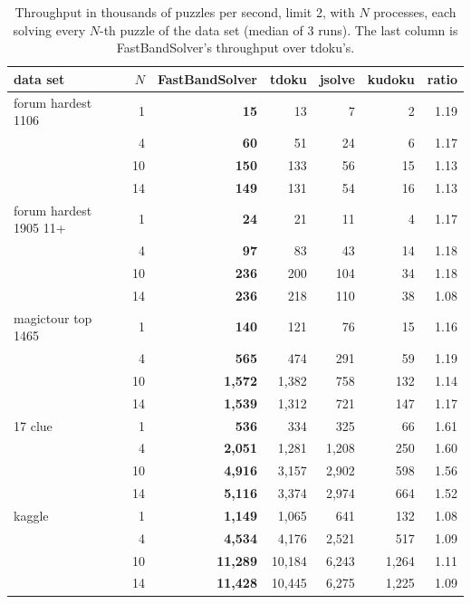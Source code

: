 \documentclass[11pt]{article}
\theoremstyle{definition}
\theoremstyle{plain}
\begin{document}
\begin{table}[t]
\centering
\caption{Throughput in thousands of puzzles per second, limit 2, with $N$ processes, each solving every $N$-th puzzle of the data set (median of 3 runs). The last column is FastBandSolver's throughput over tdoku's.}
\label{tab:throughput}
\small
\begin{tabular}{lrrrrrr}
\toprule
data set & $N$ & FastBandSolver & tdoku & jsolve & kudoku & ratio \\
\midrule
forum hardest 1106 & 1 & \textbf{15} & 13 & 7 & 2 & 1.19 \\
 & 4 & \textbf{60} & 51 & 24 & 6 & 1.17 \\
 & 10 & \textbf{150} & 133 & 56 & 15 & 1.13 \\
 & 14 & \textbf{149} & 131 & 54 & 16 & 1.13 \\
\midrule
forum hardest 1905 11+ & 1 & \textbf{24} & 21 & 11 & 4 & 1.17 \\
 & 4 & \textbf{97} & 83 & 43 & 14 & 1.18 \\
 & 10 & \textbf{236} & 200 & 104 & 34 & 1.18 \\
 & 14 & \textbf{236} & 218 & 110 & 38 & 1.08 \\
\midrule
magictour top 1465 & 1 & \textbf{140} & 121 & 76 & 15 & 1.16 \\
 & 4 & \textbf{565} & 474 & 291 & 59 & 1.19 \\
 & 10 & \textbf{1{,}572} & 1{,}382 & 758 & 132 & 1.14 \\
 & 14 & \textbf{1{,}539} & 1{,}312 & 721 & 147 & 1.17 \\
\midrule
17 clue & 1 & \textbf{536} & 334 & 325 & 66 & 1.61 \\
 & 4 & \textbf{2{,}051} & 1{,}281 & 1{,}208 & 250 & 1.60 \\
 & 10 & \textbf{4{,}916} & 3{,}157 & 2{,}902 & 598 & 1.56 \\
 & 14 & \textbf{5{,}116} & 3{,}374 & 2{,}974 & 664 & 1.52 \\
\midrule
kaggle & 1 & \textbf{1{,}149} & 1{,}065 & 641 & 132 & 1.08 \\
 & 4 & \textbf{4{,}534} & 4{,}176 & 2{,}521 & 517 & 1.09 \\
 & 10 & \textbf{11{,}289} & 10{,}184 & 6{,}243 & 1{,}264 & 1.11 \\
 & 14 & \textbf{11{,}428} & 10{,}445 & 6{,}275 & 1{,}225 & 1.09 \\
\bottomrule
\end{tabular}
\end{table}
\end{document}

